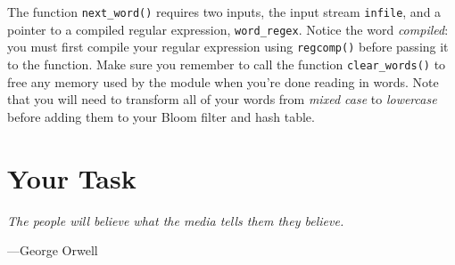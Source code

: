 \documentclass{article}
\begin{document}
The function \texttt{next\_word()} requires two inputs, the input stream
\texttt{infile}, and a pointer to a compiled regular expression,
\texttt{word\_regex}. Notice the word \emph{compiled}: you must first compile
your regular expression using \texttt{regcomp()} before passing it to the
function. Make sure you remember to call the function \texttt{clear\_words()} to
free any memory used by the module when you're done reading in words. Note that
you will need to transform all of your words from \emph{mixed case} to
\emph{lowercase} before adding them to your Bloom filter and hash table.

\section{Your Task}
\epigraph{\emph{The people will believe what the media tells them they
believe.}}{---George Orwell}
\end{document}

